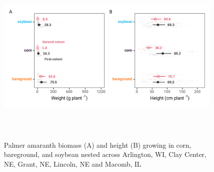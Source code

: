 \documentclass[utf8]{frontiersSCNS}
\begin{document}
\begin{figure}

{\centering \includegraphics[width=150mm,height=90mm]{../data analysis/figures/Figure 3} 

}

\caption{Palmer amaranth biomass (A) and height (B) growing in corn, bareground, and soybean nested across Arlington, WI, Clay Center, NE, Grant, NE, Lincoln, NE and Macomb, IL}\label{fig:Figure-3}
\end{figure}
\end{document}
